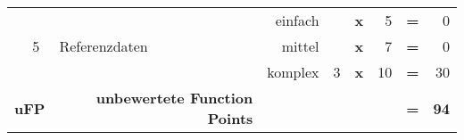 \begin{table}[htbp]
\begin{tabular}{rlrrccrcr}
		\multicolumn{1}{l}{\textbf{}} & \multirow{3}[6]{*}{5} & \multicolumn{1}{l}{\multirow{3}[6]{*}{Referenzdaten}} & einfach &       & \textbf{x} & 5     & \textbf{=} & 0 \\
		\multicolumn{1}{l}{\textbf{}} &       & \multicolumn{1}{l}{} & mittel &       & \textbf{x} & 7     & \textbf{=} & 0 \\
		\multicolumn{1}{l}{\textbf{}} &       & \multicolumn{1}{l}{} & komplex & 3     & \textbf{x} & 10    & \textbf{=} & 30 \\ \hline
		\multicolumn{2}{l}{\textbf{uFP}} & \textbf{unbewertete Function Points} & \multicolumn{1}{c}{\textbf{}} & \textbf{} & \textbf{} & \multicolumn{1}{c}{\textbf{}} & \textbf{=} & \textbf{94} \\
		\bottomrule
	\end{tabular}%
	\label{tab:addlabel}%
\end{table}%